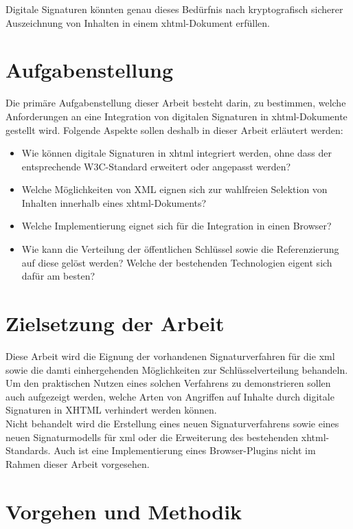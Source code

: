 Digitale Signaturen könnten genau dieses Bedürfnis nach kryptografisch sicherer Auszeichnung von Inhalten in einem \gls{xhtml}-Dokument erfüllen.

\section{Aufgabenstellung}
%
\label{sec:Einleitung:aufgabenstellung}
Die primäre Aufgabenstellung dieser Arbeit besteht darin, zu bestimmen, welche Anforderungen an eine Integration von digitalen Signaturen in
\gls{xhtml}-Dokumente gestellt wird. Folgende Aspekte sollen deshalb in dieser Arbeit erläutert werden:
\begin{itemize}
    \item Wie können digitale Signaturen in \gls{xhtml} integriert werden, ohne dass der entsprechende W3C-Standard\cite{xhtml:w3c} erweitert oder angepasst
    werden?
    \item Welche Möglichkeiten von XML eignen sich zur wahlfreien Selektion von Inhalten innerhalb eines \gls{xhtml}-Dokuments?
    \item Welche Implementierung eignet sich für die Integration in einen Browser?
    \item Wie kann die Verteilung der öffentlichen Schlüssel sowie die Referenzierung auf diese gelöst werden? Welche der bestehenden Technologien eigent sich
    dafür am besten?
\end{itemize}

\section{Zielsetzung der Arbeit}
\label{sec:Einleitung:ziele}
Diese Arbeit wird die Eignung der vorhandenen Signaturverfahren für die \gls{xml} sowie  die damti einhergehenden Möglichkeiten zur Schlüsselverteilung
behandeln. Um den praktischen Nutzen eines solchen Verfahrens zu demonstrieren sollen auch aufgezeigt werden, welche Arten von Angriffen auf Inhalte durch
digitale Signaturen in XHTML verhindert werden können.\\

Nicht behandelt wird die Erstellung eines neuen Signaturverfahrens sowie eines neuen Signaturmodells für \gls{xml} oder die Erweiterung des bestehenden
\gls{xhtml}-Standards. Auch ist eine Implementierung eines Browser-Plugins nicht im Rahmen dieser Arbeit vorgesehen.

\section{Vorgehen und Methodik}
\label{sec:Einleitung:methodik}


